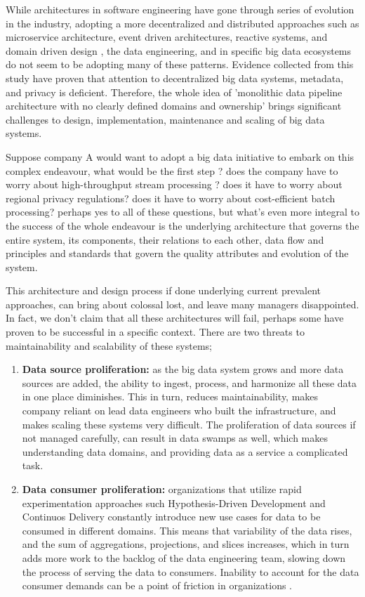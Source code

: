 \documentclass[review]{elsarticle}
\begin{document}
While architectures in software engineering have gone through series of evolution in the industry, adopting a more decentralized and distributed approaches such as microservice architecture, event driven architectures, reactive systems, and domain driven design \cite{alshuqayran2016systematic}, the data engineering, and in specific big data ecosystems do not seem to be adopting many of these patterns. Evidence collected from this study have proven that attention to decentralized big data systems, metadata, and privacy is deficient. Therefore, the whole idea of 'monolithic data pipeline architecture with no clearly defined domains and ownership' brings significant challenges to design, implementation, maintenance and scaling of big data systems. 

Suppose company A would want to adopt a big data initiative to embark on this complex endeavour, what would be the first step ? does the company have to worry about high-throughput stream processing ? does it have to worry about regional privacy regulations? does it have to worry about cost-efficient batch processing? perhaps yes to all of these questions, but what's even more integral to the success of the whole endeavour is the underlying architecture that governs the entire system, its components, their relations to each other, data flow and principles and standards that govern the quality attributes and evolution of the system.

This architecture and design process if done underlying current prevalent approaches, can bring about colossal lost, and leave many managers disappointed. In fact, we don't claim that all these architectures will fail, perhaps some have proven to be successful in a specific context. There are two threats to maintainability and scalability of these systems; 

\begin{enumerate}
    \item \textbf{Data source proliferation:} as the big data system grows and more data sources are added, the ability to ingest, process, and harmonize all these data in one place diminishes. This in turn, reduces maintainability, makes company reliant on lead data engineers who built the infrastructure, and makes scaling these systems very difficult. The proliferation of data sources if not managed carefully, can result in data swamps as well, which makes understanding data domains, and providing data as a service a complicated task. 
    \item \textbf{Data consumer proliferation:} organizations that utilize rapid experimentation approaches such Hypothesis-Driven Development and Continuos Delivery \cite{hypothesisDev} constantly introduce new use cases for data to be consumed in different domains. This means that variability of the data rises, and the sum of aggregations, projections, and slices increases, which in turn adds more work to the backlog of the data engineering team, slowing down the process of serving the data to consumers. Inability to account for the data consumer demands can be a point of friction in organizations \cite{monolithToMesh}.  
\end{enumerate}
\end{document}
